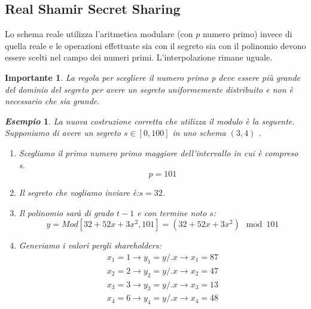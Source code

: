 \documentclass{book}
\newtheorem*{Importante}{\textbf{Importante}}
\newtheorem{esempio}{\emph{Esempio}}
\begin{document}
\subsection{Real Shamir Secret Sharing}
Lo schema reale utilizza l'aritmetica modulare (con \(p\) numero primo) invece di quella reale e  le operazioni effettuate sia con il segreto sia con il polinomio devono essere scelti nel campo dei numeri primi\@.\newline
L'interpolazione rimane uguale\@.
\begin{Importante}
    La regola per scegliere il numero primo p deve essere più grande del dominio del segreto per avere un segreto uniformemente distribuito e non è necessario che sia grande\@.
\end{Importante}
\begin{esempio}
    La nuova costruzione corretta che utilizza il modulo è la seguente\@.\newline
    Supponiamo di avere un segreto \(s\in[0,100]\) in uno schema \((3,4) \) \@.
    \begin{enumerate}
        \item Scegliamo il primo numero primo maggiore dell'intervallo in cui è compreso s\@.
              \begin{equation*}
                  p=101
              \end{equation*}
        \item Il segreto che vogliamo inviare è:\@ \(s=32\).
        \item Il polinomio sarà di grado \(t-1\) e con termine noto \(s\):\begin{equation*}
                  y=Mod[32+52x+3x^{2},101]=(32+52x+3x^{2})\mod{101}
              \end{equation*}
        \item Generiamo i valori pergli shareholders:
              \begin{equation*}
                  \begin{matrix}
                      x_{1}=1\rightarrow y_{1}=y/.{x\rightarrow x_{1}}=87 \\
                      x_{2}=2\rightarrow y_{2}=y/.{x\rightarrow x_{2}}=47 \\
                      x_{3}=3\rightarrow y_{3}=y/.{x\rightarrow x_{3}}=13 \\
                      x_{4}=6\rightarrow y_{4}=y/.{x\rightarrow x_{4}}=48 \\
                  \end{matrix}
              \end{equation*}

\end{enumerate}
\end{esempio}
\end{document}
